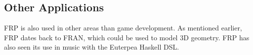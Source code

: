 \subsection{Other Applications}
\gls{FRP} is also used in other areas than game development. As mentioned earlier, \gls{FRP} dates back to FRAN, which could be used to model 3D geometry\cite{ElliottHudak97:Fran}. \gls{FRP} has also seen its use in music with the Euterpea Haskell \gls{DSL}\cite{euterpea}.
